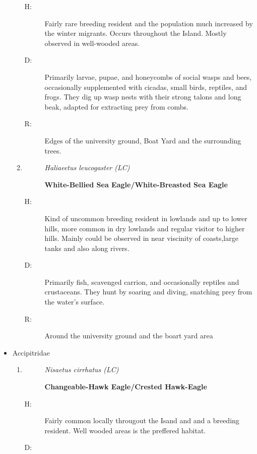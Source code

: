 \begin{itemize}
\begin{enumerate}
\begin{description}%
\item[H: ]%
Fairly rare breeding resident and the population much increased by the winter migrants. Occurs throughout the Island. Mostly observed in well{-}wooded areas.%
\item[D: ]%
Primarily larvae, pupae, and honeycombs of social wasps and bees, occasionally supplemented with cicadas, small birds, reptiles, and frogs. They dig up wasp nests with their strong talons and long beak, adapted for extracting prey from combs.%
\item[R: ]%
Edges of the university ground, Boat Yard and the surrounding trees.%
\end{description}%
\item%
\begin{description}%
\item[]%
\textit{Haliaeetus leucogaster (LC)}%
\item[]%
\textbf{White{-}Bellied Sea Eagle/White{-}Breasted Sea Eagle}%
\end{description}%
\begin{description}%
\item[H: ]%
Kind of uncommon breeding resident in lowlands and up to lower hills, more common in dry lowlands and regular visitor to higher hills. Mainly could be observed in near viscinity of coasts,large tanks and also along rivers.%
\item[D: ]%
Primarily fish, scavenged carrion, and occasionally reptiles and crustaceans. They hunt by soaring and diving, snatching prey from the water's surface.%
\item[R: ]%
Around the university ground and the boart yard area%
\end{description}%
\end{enumerate}%
\item%
Accipitridae%
\begin{enumerate}%
\item%
\begin{description}%
\item[]%
\textit{Nisaetus cirrhatus (LC)}%
\item[]%
\textbf{Changeable{-}Hawk Eagle/Crested Hawk{-}Eagle}%
\end{description}%
\begin{description}%
\item[H: ]%
Fairly common locally througout the Isand and and a breeding resident. Well wooded areas is the preffered habitat.%
\item[D: ]%

\end{description}
\end{enumerate}
\end{itemize}
